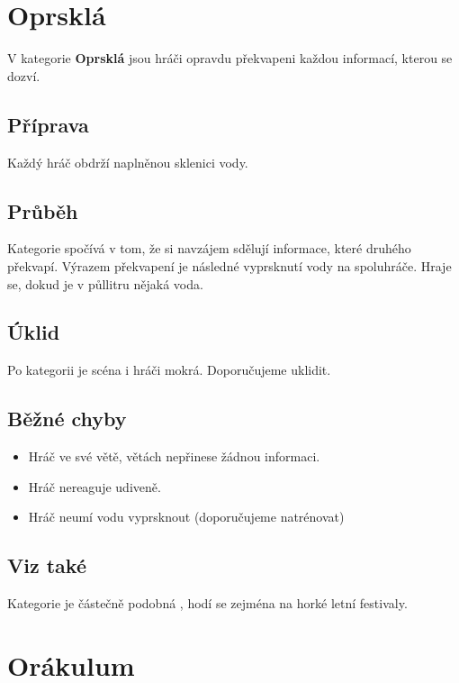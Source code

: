 \documentclass[main.tex]{subfiles}
\begin{document}
 
 
\needspace{5cm} \section{Oprsklá} \label{oprsklá}  
 
V kategorie \textbf{Oprsklá}{} jsou hráči opravdu překvapeni každou informací, kterou se dozví. 
 
\subsection{Příprava} Každý hráč obdrží naplněnou sklenici vody.  
 
\subsection{Průběh} Kategorie spočívá v tom, že si navzájem sdělují informace, které druhého překvapí. Výrazem překvapení je následné vyprsknutí vody na spoluhráče. Hraje se, dokud je v půllitru nějaká voda.  
 
\subsection{Úklid} Po kategorii je scéna i hráči mokrá. Doporučujeme uklidit. 
 
\subsection{Běžné chyby} \begin{itemize}
\item Hráč ve své větě, větách nepřinese žádnou informaci.
\item Hráč nereaguje udiveně.
\item Hráč neumí vodu vyprsknout (doporučujeme natrénovat)
\end{itemize}
 
\subsection{Viz také} Kategorie je částečně podobná , hodí se zejména na horké letní festivaly. 
 
 
 
\needspace{5cm} \section{Orákulum} \label{orákulum}  
 
\end{document}
